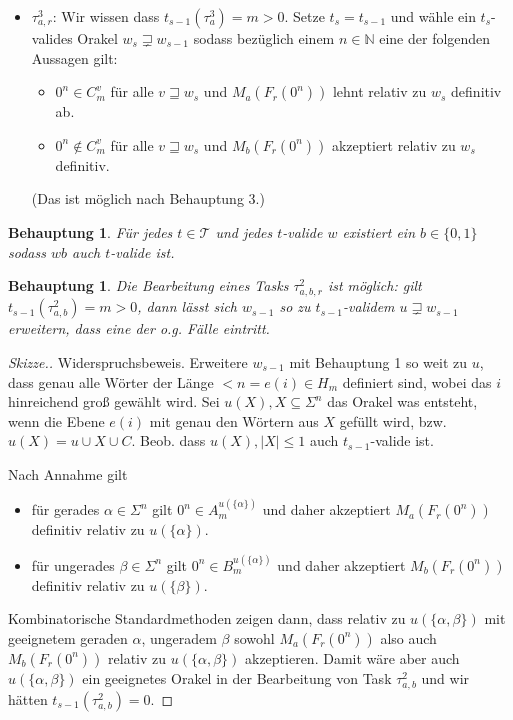 \documentclass[nofonts]{uebung}
\newtheorem{claim}[theorem]{Behauptung}
\DeclareMathOperator{\img}{img}
\begin{document}
\begin{itemize}
        Ansonsten wähle ein hinreichend großes $m\not\in \img(t_s)$ sodass $w_s$ kein Wort der Länge $\min H_m$ definiert. Setze $t_s\coloneqq t_{s-1}\cup \{ \tau^3_{a,b}\mapsto m \}$; damit ist $w_{s-1}$ auch $t_s$-valide. Setze $w_s\coloneqq w_{s-1}y$ für geeignetes $y\in\{0,1\}$ sodass $w_s$ auch $t_s$-valide ist. (Das ist möglich nach Behauptung 1.)

    \item $\tau^3_{a,r}$: Wir wissen dass $t_{s-1}(\tau^3_{a})=m>0$. Setze $t_s=t_{s-1}$ und wähle ein $t_s$-valides Orakel $w_s\sqsupsetneq w_{s-1}$ sodass bezüglich einem $n\in\mathbb N$ eine der folgenden Aussagen gilt:
        \begin{itemize}[nosep,endpenalty=10000]
            \item $0^n\in C_m^v$ für alle $v\sqsupseteq w_s$ und $M_a(F_r(0^n))$ lehnt relativ zu $w_s$ definitiv ab.
            \item $0^n\not\in C_m^v$ für alle $v\sqsupseteq w_s$ und $M_b(F_r(0^n))$ akzeptiert relativ zu $w_s$ definitiv.
        \end{itemize} (Das ist möglich nach Behauptung 3.)
\end{itemize}

\begin{claim}
    Für jedes $t\in\mathcal T$ und jedes $t$-valide $w$ existiert ein $b\in\{0,1\}$ sodass $wb$ auch $t$-valide ist.
\end{claim}

\begin{claim}
    Die Bearbeitung eines Tasks $\tau^2_{a,b,r}$ ist möglich: gilt $t_{s-1}(\tau^2_{a,b})=m>0$, dann lässt sich $w_{s-1}$ so zu $t_{s-1}$-validem $u\sqsupsetneq w_{s-1}$ erweitern, dass eine der o.g. Fälle eintritt.
\end{claim}
\begin{proof}[Skizze.]
    Widerspruchsbeweis. Erweitere $w_{s-1}$ mit Behauptung 1 so weit zu $u$, dass genau alle Wörter der Länge $<n=e(i)\in H_m$ definiert sind, wobei das $i$ hinreichend groß gewählt wird. Sei $u(X), X\subseteq \Sigma^n$ das Orakel was entsteht, wenn die Ebene $e(i)$ mit genau den Wörtern aus $X$ gefüllt wird, bzw. $u(X)=u\cup X \cup C$. Beob. dass $u(X), |X|\leq 1$ auch $t_{s-1}$-valide ist.

    Nach Annahme gilt
    \begin{itemize}
        \item für gerades $\alpha\in \Sigma^n$ gilt $0^n\in A_m^{u(\{\alpha\})}$ und daher akzeptiert $M_a(F_r(0^n))$ definitiv relativ zu $u(\{\alpha\})$.
        \item für ungerades $\beta\in \Sigma^n$ gilt $0^n\in B_m^{u(\{\alpha\})}$ und daher akzeptiert $M_b(F_r(0^n))$ definitiv relativ zu $u(\{\beta\})$.
    \end{itemize}
    Kombinatorische Standardmethoden zeigen dann, dass relativ zu $u(\{\alpha,\beta\})$ mit geeignetem geraden $\alpha$, ungeradem $\beta$ sowohl $M_a(F_r(0^n))$ also auch $M_b(F_r(0^n))$ relativ zu $u(\{\alpha,\beta\})$ akzeptieren.
    Damit wäre aber auch $u(\{\alpha,\beta\})$ ein geeignetes Orakel in der Bearbeitung von Task $\tau^2_{a,b}$ und wir hätten $t_{s-1}(\tau^2_{a,b})=0$.
\end{proof}
\end{document}
